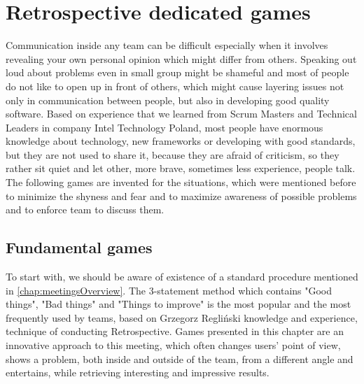 \chapter{Retrospective dedicated games}
\label{ch:retroDedGams}
Communication inside any team can be difficult especially when it involves revealing your own personal opinion which might differ from others. Speaking out loud about problems even in small group might be shameful and most of people do not like to open up in front of others, which might cause layering issues not only in communication between people, but also in developing good quality software. Based on experience that we learned from Scrum Masters and Technical Leaders in company Intel Technology Poland, most people have enormous knowledge about technology, new frameworks or developing with good standards, but they are not used to share it, because they are afraid of criticism, so they rather sit quiet and let other, more brave, sometimes less experience, people talk. 
The following games are invented for the situations, which were mentioned before to minimize the shyness and fear and to maximize awareness of possible problems and to enforce team to discuss them.

\section{Fundamental games}
\label{s:fundGames}
To start with, we should be aware of existence of a standard procedure mentioned in \autoref{chap:meetingsOverview}. The 3-statement method which contains "Good things", "Bad things" and "Things to improve" is the most popular and the most frequently used by teams, based on Grzegorz Regliński knowledge and experience, technique of conducting Retrospective. Games presented in this chapter are an innovative approach to this meeting, which often changes users' point of view, shows a problem, both inside and outside of the team, from a different angle and entertains, while retrieving interesting and impressive results. 

